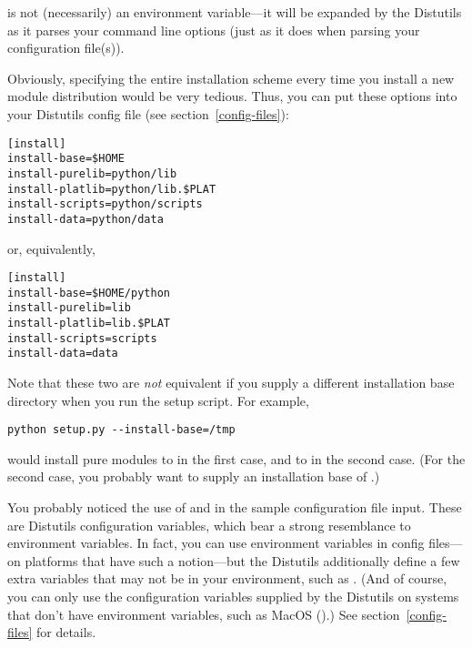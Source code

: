 \documentclass{howto}
\begin{document}
 is not (necessarily) an environment variable---it will be
expanded by the Distutils as it parses your command line options (just
as it does when parsing your configuration file(s)).

Obviously, specifying the entire installation scheme every time you
install a new module distribution would be very tedious.  Thus, you can
put these options into your Distutils config file (see
section~\ref{config-files}):

\begin{verbatim}
[install]
install-base=$HOME
install-purelib=python/lib
install-platlib=python/lib.$PLAT
install-scripts=python/scripts
install-data=python/data
\end{verbatim}

or, equivalently,

\begin{verbatim}
[install]
install-base=$HOME/python
install-purelib=lib
install-platlib=lib.$PLAT
install-scripts=scripts
install-data=data
\end{verbatim}

Note that these two are \emph{not} equivalent if you supply a different
installation base directory when you run the setup script.  For example,

\begin{verbatim}
python setup.py --install-base=/tmp
\end{verbatim}

would install pure modules to  in the first
case, and to  in the second case.  (For the second
case, you probably want to supply an installation base of
.)

You probably noticed the use of  and  in the
sample configuration file input.  These are Distutils configuration
variables, which bear a strong resemblance to environment variables.  In
fact, you can use environment variables in config files---on platforms
that have such a notion---but the Distutils additionally define a few
extra variables that may not be in your environment, such as
.  (And of course, you can only use the configuration
variables supplied by the Distutils on systems that don't have
environment variables, such as MacOS ().)  See
section~\ref{config-files} for details.

\end{document}
